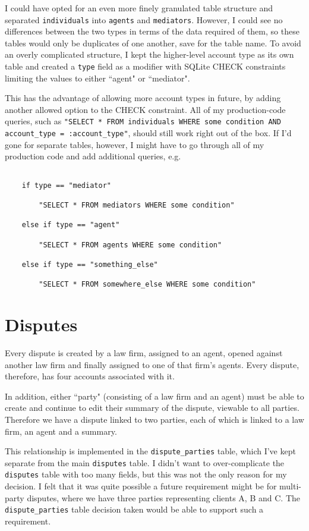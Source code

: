 I could have opted for an even more finely granulated table structure and separated \lstinline{individuals} into \lstinline{agents} and \lstinline{mediators}. However, I could see no differences between the two types in terms of the data required of them, so these tables would only be duplicates of one another, save for the table name. To avoid an overly complicated structure, I kept the higher-level account type as its own table and created a \lstinline{type} field as a modifier with SQLite CHECK constraints limiting the values to either ``agent" or ``mediator".

This has the advantage of allowing more account types in future, by adding another allowed option to the CHECK constraint. All of my production-code queries, such as \lstinline{"SELECT * FROM individuals WHERE some condition AND account_type = :account_type"}, should still work right out of the box. If I'd gone for separate tables, however, I might have to go through all of my production code and add additional queries, e.g.

\begin{lstlisting}

    if type == "mediator"
    
        "SELECT * FROM mediators WHERE some condition"
    
    else if type == "agent"
    
        "SELECT * FROM agents WHERE some condition"
    
    else if type == "something_else"
    
        "SELECT * FROM somewhere_else WHERE some condition"

\end{lstlisting}

\section{Disputes}

Every dispute is created by a law firm, assigned to an agent, opened against another law firm and finally assigned to one of that firm's agents. Every dispute, therefore, has four accounts associated with it.

In addition, either ``party" (consisting of a law firm and an agent) must be able to create and continue to edit their summary of the dispute, viewable to all parties. Therefore we have a dispute linked to two parties, each of which is linked to a law firm, an agent and a summary.

This relationship is implemented in the \lstinline{dispute_parties} table, which I've kept separate from the main \lstinline{disputes} table. I didn't want to over-complicate the \lstinline{disputes} table with too many fields, but this was not the only reason for my decision. I felt that it was quite possible a future requirement might be for multi-party disputes, where we have three parties representing clients A, B and C. The \lstinline{dispute_parties} table decision taken would be able to support such a requirement.

